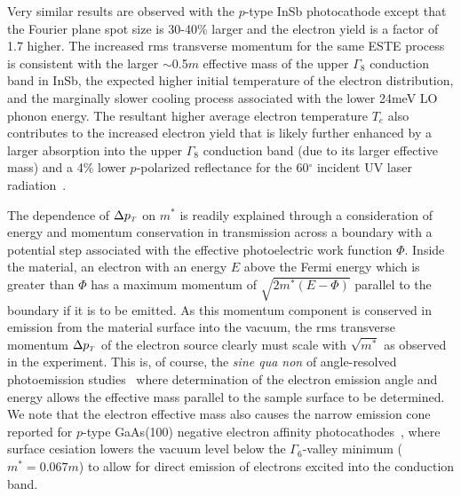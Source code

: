 Very similar results are observed with the $p$-type InSb photocathode except that the Fourier plane spot size is 30-40\%  larger and the electron yield is a factor of 1.7 higher.
The increased rms transverse momentum for the same ESTE process is consistent with the larger $\sim$0.5$m$ effective mass of the upper $\Gamma_8$ conduction band in InSb, the expected higher initial temperature of the electron distribution, and the marginally slower cooling process associated with the lower 24meV LO phonon energy.
The resultant higher average electron temperature $T_e$ also contributes to the increased electron yield that is likely further enhanced by a larger absorption into the upper $\Gamma_8$ conduction band (due to its larger effective mass) and a 4\% lower $p$-polarized reflectance for the 60$^{\circ}$ incident UV laser radiation~\cite{aspnes_dielectric_1983}. 

The dependence of $\Delta p_{{\scriptscriptstyle T}}$ on $m^*$ is readily explained through a consideration of energy and momentum conservation in transmission across a boundary with a potential step associated with the effective photoelectric work function $\Phi$.
Inside the material, an electron with an energy $E$ above the Fermi energy which is greater than $\Phi$ has a maximum momentum of $\sqrt{2 m^* (E-\Phi) }$ parallel to the boundary if it is to be emitted.
As this momentum component is conserved in emission from the material surface into the vacuum, the rms transverse momentum $\Delta p_{{\scriptscriptstyle T}}$ of the electron source clearly must scale with $\sqrt{m^*}$ as observed in the experiment.
This is, of course, the \textit{sine qua non} of angle-resolved photoemission studies~\cite{himpsel_angle-resolved_1983} where determination of the electron emission angle and energy allows the effective mass parallel to the sample surface to be determined.
We note that the electron effective mass also causes the narrow emission cone reported for $p$-type GaAs(100) negative electron affinity photocathodes~\cite{liu_narrow_2005}, where surface cesiation lowers the vacuum level below the $\Gamma_6$-valley minimum ($m^* = 0.067m$)  to allow for direct emission of electrons excited into the conduction band.

